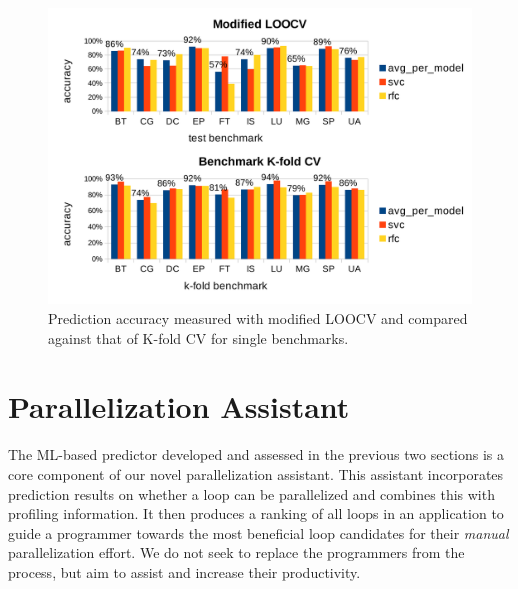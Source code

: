 \begin{figure}[ht]
\includegraphics[width=1.0\textwidth]{images/LOOCV_accuracy.pdf}
\caption{Prediction accuracy measured with modified LOOCV and compared against that of K-fold CV for single benchmarks.}
\label{fig:accuracy_loocv_vs_kfold}
\vspace{-5mm}
\end{figure}

\section{Parallelization Assistant}
\label{practical_applications}

The ML-based predictor developed and assessed in the previous two sections is a core component of our novel parallelization assistant. This assistant incorporates prediction results on whether a loop can be parallelized and combines this with profiling information. It then produces a ranking of all loops in an application to guide a programmer towards the most beneficial loop candidates for their \textit{manual} parallelization effort. We do not seek to replace the programmers from the process, but aim to assist and increase their productivity.


